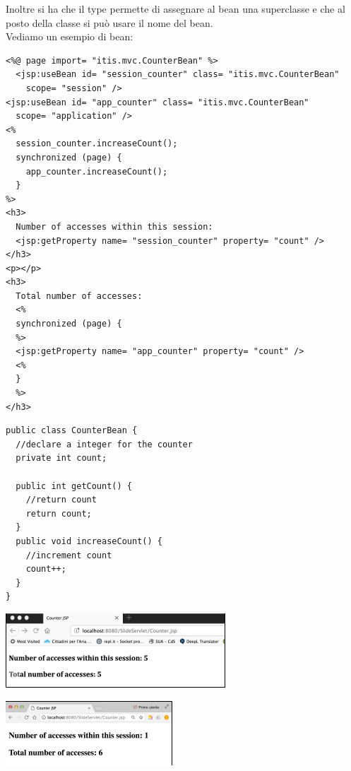 \message{ !name(sd.tex)}\documentclass[a4paper,12pt, oneside]{book}
\begin{document}
Inoltre si ha che il type permette di assegnare al bean una superclasse e che al posto della classe si può usare il nome del bean.\\
Vediamo un esempio di bean:
\begin{verbatim}
<%@ page import= "itis.mvc.CounterBean" %>
  <jsp:useBean id= "session_counter" class= "itis.mvc.CounterBean"
    scope= "session" />
<jsp:useBean id= "app_counter" class= "itis.mvc.CounterBean"
  scope= "application" />
<%
  session_counter.increaseCount();
  synchronized (page) {
    app_counter.increaseCount();
  }
%>
<h3>
  Number of accesses within this session:
  <jsp:getProperty name= "session_counter" property= "count" />
</h3>
<p></p>
<h3>
  Total number of accesses:
  <%
  synchronized (page) {
  %>
  <jsp:getProperty name= "app_counter" property= "count" />
  <%
  }
  %>
</h3>
\end{verbatim} 
\begin{verbatim}
public class CounterBean {
  //declare a integer for the counter
  private int count;
  
  public int getCount() {
    //return count
    return count;
  }
  public void increaseCount() {
    //increment count
    count++;
  }
}
\end{verbatim}
\begin{center}
	\includegraphics[scale=0.7]{img/count1.png}
\end{center}
\begin{center}
	\includegraphics[scale=0.8]{img/count2.png}
\end{center}
\end{document}
